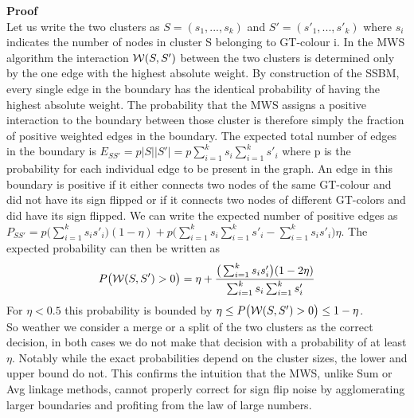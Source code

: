 \textbf{Proof} \\
Let us write the two clusters as $S=(s_1, ..., s_k)$ and $S'=(s'_1, ..., s'_k)$ where $s_i$ indicates the number of nodes in cluster S belonging to GT-colour i. In the MWS algorithm the interaction $\mathcal{W}(S,S')$ between the two clusters is determined only by the one edge with the highest absolute weight. By construction of the SSBM, every single edge in the boundary has the identical probability of having the highest absolute weight. The probability that the MWS assigns a positive interaction to the boundary between those cluster is therefore simply the fraction of positive weighted edges in the boundary. 
The expected total number of edges in the boundary is $E_{SS'}=p|S||S'|=p\sum_{i=1}^{k}s_i \sum_{i=1}^{k}s'_i$ where p is the probability for each individual edge to be present in the graph. An edge in this boundary is positive if it either connects two nodes of the same GT-colour and did not have its sign flipped or if it connects two nodes of different GT-colors and did have its sign flipped. We can write the expected number of positive edges as $P_{SS'}=p\big(\sum_{i=1}^{k}s_is'_i\big)(1-\eta)+p\big(\sum_{i=1}^{k}s_i \sum_{i=1}^{k}s'_i - \sum_{i=1}^{k}s_is'_i\big)\eta$. The expected probability can then be written as 
\begin{equation}
    P\big(\mathcal{W}(S,S')>0\big)=\eta +  \frac{\big(\sum_{i=1}^{k}s_is'_i\big)(1-2\eta)}{\sum_{i=1}^{k}s_i \sum_{i=1}^{k}s'_i}
\end{equation}
For $\eta <0.5$ this probability is bounded by $\eta \leq P\big(\mathcal{W}(S,S')>0\big) \leq 1-\eta$. \\
So weather we consider a merge or a split of the two clusters as the correct decision, in both cases we do not make that decision with a probability of at least $\eta$. Notably while the exact probabilities depend on the cluster sizes, the lower and upper bound do not. This confirms the intuition that the MWS, unlike Sum or Avg linkage methods, cannot properly correct for sign flip noise by agglomerating larger boundaries and profiting from the law of large numbers. 

